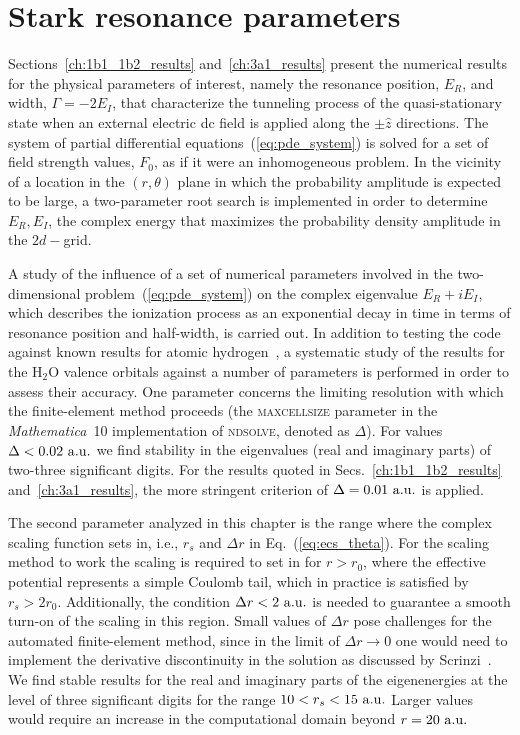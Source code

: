 \section{Stark resonance parameters}
\label{ch:stark_params}

Sections~\ref{ch:1b1_1b2_results} and~\ref{ch:3a1_results} present the
numerical results for the physical parameters of interest, namely the
resonance position, $E_{R}$, and width, $\Gamma = -2E_{I}$, that
characterize the tunneling process of the quasi-stationary state when
an external electric dc field is applied along the $\pm\hat{z}$
directions. The system of partial differential
equations~(\ref{eq:pde_system}) is solved for a set of field strength
values, $F_{0}$, as if it were an inhomogeneous problem. In the
vicinity of a location in the $(r,\theta)$ plane in which the
probability amplitude is expected to be large, a two-parameter root
search is implemented in order to determine ${E_{R}, E_{I}}$, the
complex energy that maximizes the probability density amplitude in the
$2d-$grid.

A study of the influence of a set of numerical parameters involved in
the two-dimensional problem~(\ref{eq:pde_system}) on the complex
eigenvalue $E_{R}+iE_{I}$, which describes the ionization process as
an exponential decay in time in terms of resonance position and
half-width, is carried out. In addition to testing the code against
known results for atomic hydrogen~\cite{Telnov_1989}, a systematic
study of the results for the H$_{2}$O valence orbitals against a
number of parameters is performed in order to assess their
accuracy. One parameter concerns the limiting resolution with which
the finite-element method proceeds (the \textsc{maxcellsize} parameter
in the \emph{Mathematica}~10 implementation of \textsc{ndsolve},
denoted as $\Delta$). For values $\Delta < 0.02\ \rm{a.u.}$ we find
stability in the eigenvalues (real and imaginary parts) of two-three
significant digits. For the results quoted in
Secs.~\ref{ch:1b1_1b2_results} and~\ref{ch:3a1_results}, the more
stringent criterion of $\Delta=0.01\ \rm{a.u.}$ is applied.

The second parameter analyzed in this chapter is the range where the
complex scaling function sets in, i.e., $r_{s}$ and $\Delta r$ in
Eq.~(\ref{eq:ecs_theta}). For the scaling method to work the scaling
is required to set in for $r > r_0$, where the effective potential
represents a simple Coulomb tail, which in practice is satisfied by
$r_{s} > 2r_{0}$. Additionally, the condition $\Delta r <
2\ \rm{a.u.}$ is needed to guarantee a smooth turn-on of the scaling
in this region. Small values of $\Delta r$ pose challenges for the
automated finite-element method, since in the limit of $\Delta r \to
0$ one would need to implement the derivative discontinuity in the
solution as discussed by Scrinzi~\cite{ecsScrinzi}. We find stable
results for the real and imaginary parts of the eigenenergies at the
level of three significant digits for the range $10 < r_{s} <
15\ \rm{a.u.}$ Larger values would require an increase in the
computational domain beyond $r=20\ \rm{a.u.}$

